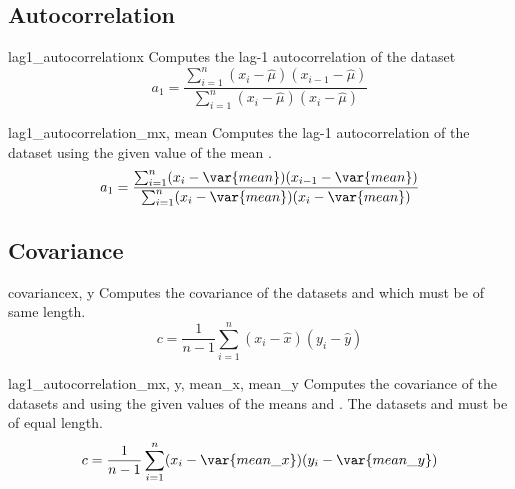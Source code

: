 \subsection{Autocorrelation}
\label{sec:stat:autocorrelation}

\begin{funcdesc}{lag1_autocorrelation}{x}
   Computes the lag-1 autocorrelation of the dataset 
   \begin{equation}
      a_1 = \frac{\sum^{n}_{i = 1} (x_{i} - \hat\mu) (x_{i-1} - \hat\mu)}{
         \sum^{n}_{i = 1} (x_{i} - \hat\mu) (x_{i} - \hat\mu)}
   \end{equation}
 \end{funcdesc}

\begin{funcdesc}{lag1_autocorrelation_m}{x, mean}
   Computes the lag-1 autocorrelation of the dataset  using the given
   value of the mean .
   \begin{equation}
      a_1 = \frac{\sum_{i = 1}^{n} (x_{i} - \var{mean}) (x_{i-1} - \var{mean})}{
         \sum^{n}_{i = 1} (x_{i} - \var{mean}) (x_{i} - \var{mean})}
   \end{equation}
\end{funcdesc}



\subsection{Covariance}
\label{sec:stat:covariance}

\begin{funcdesc}{covariance}{x, y}
   Computes the covariance of the datasets  and  which must be of
   same length.
   \begin{equation}
      c = \frac{1}{n-1} \sum^{n}_{i=1} (x_i - \hat x) (y_i - \hat y)
   \end{equation}
\end{funcdesc}

\begin{funcdesc}{lag1_autocorrelation_m}{x, y, mean\_x, mean\_y}
   Computes the covariance of the datasets  and  using the given
   values of the means  and . The datasets 
   and  must be of equal length.
   \begin{equation}
      c = \frac{1}{n-1} \sum^{n}_{i=1} (x_i - \var{mean\_x}) (y_i -
      \var{mean\_y})
   \end{equation}
\end{funcdesc}




